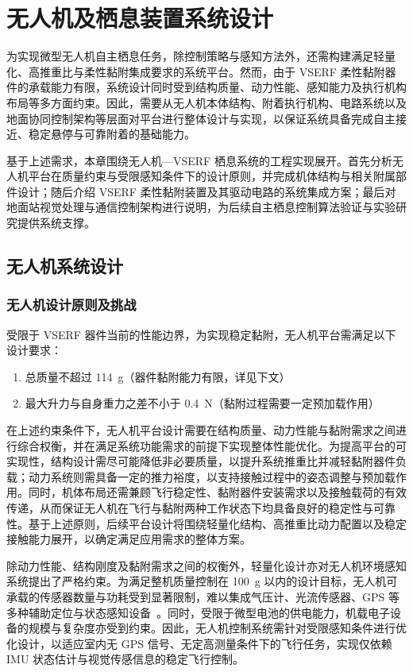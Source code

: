 \chapter{无人机及栖息装置系统设计}
为实现微型无人机自主栖息任务，除控制策略与感知方法外，还需构建满足轻量化、高推重比与柔性黏附集成要求的系统平台。然而，由于 VSERF 柔性黏附器件的承载能力有限，系统设计同时受到结构质量、动力性能、感知能力及执行机构布局等多方面约束。因此，需要从无人机本体结构、附着执行机构、电路系统以及地面协同控制架构等层面对平台进行整体设计与实现，以保证系统具备完成自主接近、稳定悬停与可靠附着的基础能力。

基于上述需求，本章围绕无人机—VSERF 栖息系统的工程实现展开。首先分析无人机平台在质量约束与受限感知条件下的设计原则，并完成机体结构与相关附属部件设计；随后介绍 VSERF 柔性黏附装置及其驱动电路的系统集成方案；最后对地面站视觉处理与通信控制架构进行说明，为后续自主栖息控制算法验证与实验研究提供系统支撑。

\section{无人机系统设计} \label{Drone_system_design}
\subsection{无人机设计原则及挑战}
受限于 VSERF 器件当前的性能边界，为实现稳定黏附，无人机平台需满足以下设计要求：

\begin{enumerate}
\item 总质量不超过 \SI{114}{g}（器件黏附能力有限，详见下文）
\item 最大升力与自身重力之差不小于 \SI{0.4}{N}（黏附过程需要一定预加载作用）
\end{enumerate}

在上述约束条件下，无人机平台设计需要在结构质量、动力性能与黏附需求之间进行综合权衡，并在满足系统功能需求的前提下实现整体性能优化。为提高平台的可实现性，结构设计需尽可能降低非必要质量，以提升系统推重比并减轻黏附器件负载；动力系统则需具备一定的推力裕度，以支持接触过程中的姿态调整与预加载作用。同时，机体布局还需兼顾飞行稳定性、黏附器件安装需求以及接触载荷的有效传递，从而保证无人机在飞行与黏附两种工作状态下均具备良好的稳定性与可靠性。基于上述原则，后续平台设计将围绕轻量化结构、高推重比动力配置以及稳定接触能力展开，以确定满足应用需求的整体方案。

除动力性能、结构刚度及黏附需求之间的权衡外，轻量化设计亦对无人机环境感知系统提出了严格约束。为满足整机质量控制在 \SI{100}{g} 以内的设计目标，无人机可承载的传感器数量与功耗受到显著限制，难以集成气压计、光流传感器、GPS 等多种辅助定位与状态感知设备~\cite{mcguire2017efficient,monteiro2017using}。同时，受限于微型电池的供电能力，机载电子设备的规模与复杂度亦受到约束。因此，无人机控制系统需针对受限感知条件进行优化设计，以适应室内无 GPS 信号、无定高测量条件下的飞行任务，实现仅依赖 IMU 状态估计与视觉传感信息的稳定飞行控制。

